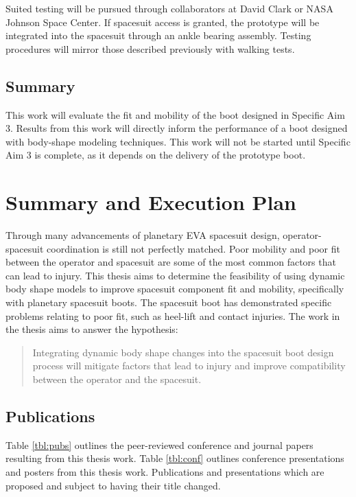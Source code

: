 \documentclass[defaultstyle,11pt]{comps}
\begin{document}
Suited testing will be pursued through collaborators at David Clark or NASA Johnson Space Center.
If spacesuit access is granted, the prototype will be integrated into the spacesuit through an ankle bearing assembly.
Testing procedures will mirror those described previously with walking tests.

\hypertarget{summary-5}{%
\section{Summary}\label{summary-5}}

This work will evaluate the fit and mobility of the boot designed in Specific Aim 3.
Results from this work will directly inform the performance of a boot designed with body-shape modeling techniques.
This work will not be started until Specific Aim 3 is complete, as it depends on the delivery of the prototype boot.

\hypertarget{summary-and-execution-plan}{%
\chapter{Summary and Execution Plan}\label{summary-and-execution-plan}}

Through many advancements of planetary EVA spacesuit design, operator-spacesuit coordination is still not perfectly matched.
Poor mobility and poor fit between the operator and spacesuit are some of the most common factors that can lead to injury.
This thesis aims to determine the feasibility of using dynamic body shape models to improve spacesuit component fit and mobility, specifically with planetary spacesuit boots.
The spacesuit boot has demonstrated specific problems relating to poor fit, such as heel-lift and contact injuries.
The work in the thesis aims to answer the hypothesis:

\begin{quote}
Integrating dynamic body shape changes into the spacesuit boot design process will mitigate factors that lead to injury and improve compatibility between the operator and the spacesuit.
\end{quote}

\hypertarget{publications}{%
\section{Publications}\label{publications}}

Table \ref{tbl:pubs} outlines the peer-reviewed conference and journal papers resulting from this thesis work.
Table \ref{tbl:conf} outlines conference presentations and posters from this thesis work.
Publications and presentations which are proposed and subject to having their title changed.
\end{document}
